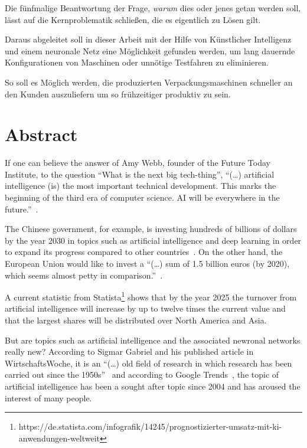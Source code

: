 Die fünfmalige Beantwortung der Frage, \textit{warum} dies oder jenes getan werden soll, lässt auf die Kernproblematik
schließen, die es eigentlich zu Lösen gilt.

Daraus abgeleitet soll in dieser Arbeit mit der Hilfe von Künstlicher Intelligenz und einem neuronale Netz eine
Möglichkeit gefunden werden, um lang dauernde Konfigurationen von Maschinen oder unnötige Testfahren zu eliminieren.

So soll es Möglich werden, die produzierten Verpackungsmaschinen schneller an den Kunden auszuliefern um so frühzeitiger
produktiv zu sein.

\newpage

\section{Abstract}
\label{sec:abstract}
If one can believe the answer of Amy Webb, founder of the Future Today Institute, to the question \enquote{What is the
next big tech-thing}, \enquote{(\ldots) artificial intelligence (is) the most important technical development. This
marks the beginning of the third era of computer science. AI will be everywhere in the
future.}~\cite{article_einleitung_dub_aw}.

The Chinese government, for example, is investing hundreds of billions of dollars by the year 2030 in topics such as
artificial intelligence and deep learning in order to expand its progress compared to other
countries~\cite{article_einleitung_css}. On the other hand, the European Union would like to invest a \enquote{(\ldots)
sum of 1.5 billion euros (by 2020), which seems almost petty in comparison.}~\cite{article_einleitung_ww_sg}.

A current statistic from
Statista\footnote{https://de.statista.com/infografik/14245/prognostizierter-umsatz-mit-ki-anwendungen-weltweit} shows
that by the year 2025 the turnover from artificial intelligence will increase by up to twelve times the current value
and that the largest shares will be distributed over North America and Asia.

But are topics such as artificial intelligence and the associated newronal networks really new? According to Sigmar
Gabriel and his published article in WirtschaftsWoche, it is an \enquote{(\ldots) old field of research in which research
has been carried out since the 1950s}~\cite{article_einleitung_ww_sg} and according to Google
Trends~\cite{online_einleitung_googletrends}, the topic of artificial intelligence has been a sought after topic since
2004 and has aroused the interest of many people.

